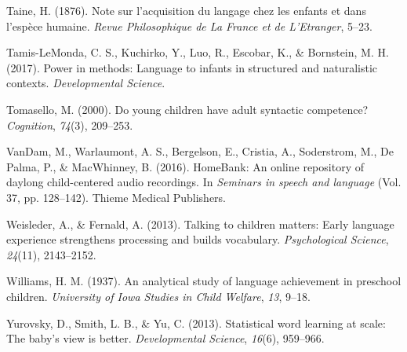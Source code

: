 \documentclass[floatsintext,man]{apa6}
\theoremstyle{definition}
\theoremstyle{definition}
\theoremstyle{definition}
\theoremstyle{remark}
\begin{document}
\hypertarget{ref-taine1876note}{}
Taine, H. (1876). Note sur l'acquisition du langage chez les enfants et
dans l'espèce humaine. \emph{Revue Philosophique de La France et de
L'Etranger}, 5--23.

\hypertarget{ref-tamis2017power}{}
Tamis-LeMonda, C. S., Kuchirko, Y., Luo, R., Escobar, K., \& Bornstein,
M. H. (2017). Power in methods: Language to infants in structured and
naturalistic contexts. \emph{Developmental Science}.

\hypertarget{ref-tomasello2000young}{}
Tomasello, M. (2000). Do young children have adult syntactic competence?
\emph{Cognition}, \emph{74}(3), 209--253.

\hypertarget{ref-vandam2016homebank}{}
VanDam, M., Warlaumont, A. S., Bergelson, E., Cristia, A., Soderstrom,
M., De Palma, P., \& MacWhinney, B. (2016). HomeBank: An online
repository of daylong child-centered audio recordings. In \emph{Seminars
in speech and language} (Vol. 37, pp. 128--142). Thieme Medical
Publishers.

\hypertarget{ref-weisleder2013talking}{}
Weisleder, A., \& Fernald, A. (2013). Talking to children matters: Early
language experience strengthens processing and builds vocabulary.
\emph{Psychological Science}, \emph{24}(11), 2143--2152.

\hypertarget{ref-williams1937analytical}{}
Williams, H. M. (1937). An analytical study of language achievement in
preschool children. \emph{University of Iowa Studies in Child Welfare},
\emph{13}, 9--18.

\hypertarget{ref-yurovsky2013statistical}{}
Yurovsky, D., Smith, L. B., \& Yu, C. (2013). Statistical word learning
at scale: The baby's view is better. \emph{Developmental Science},
\emph{16}(6), 959--966.
\end{document}

